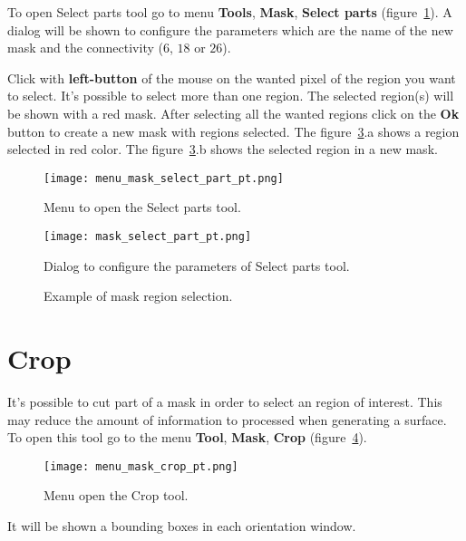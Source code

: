 To open Select parts tool go to menu \textbf{Tools}, \textbf{Mask}, \textbf{Select parts} (figure~\ref{fig:menu_mask_select_part}). A dialog will be shown to configure the parameters which are the name of the new mask and the connectivity ($6$, $18$ or $26$).

Click with \textbf{left-button} of the mouse on the wanted pixel of the region you want to select. It's possible to select more than one region. The selected region(s) will be shown with a red mask. After selecting all the wanted regions click on the \textbf{Ok} button to create a new mask with regions selected. The figure~\ref{fig:mask_selected_part}.a shows a region selected in red color. The figure~\ref{fig:mask_selected_part}.b shows the selected region in a new mask.


\begin{figure}[!htb]
\centering
\texttt{[image: menu\_mask\_select\_part\_pt.png]}
\caption{Menu to open the Select parts tool.}
\label{fig:menu_mask_select_part}
\end{figure}

\begin{figure}[!htb]
\centering
\texttt{[image: mask\_select\_part\_pt.png]}
\caption{Dialog to configure the parameters of Select parts tool.}
\label{fig:mask_select_part}
\end{figure}

\begin{figure}[!htb]
  \centering
    \qquad
  \hfill
  \caption{Example of mask region selection.}
  \label{fig:mask_selected_part}
\end{figure}

\section{Crop}

It's possible to cut part of a mask in order to select an region of interest. This may reduce the amount of information to processed when generating a surface. To open this tool go to the menu \textbf{Tool}, \textbf{Mask}, \textbf{Crop} (figure~\ref{fig:menu_mask_crop}).

\begin{figure}[!htb]
\centering
\texttt{[image: menu\_mask\_crop\_pt.png]}
\caption{Menu open the Crop tool.}
\label{fig:menu_mask_crop}
\end{figure}

It will be shown a bounding boxes in each orientation window.
